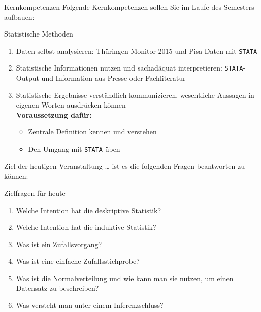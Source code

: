 \documentclass[usenames,dvipsnames,handout]{beamer}
\begin{document}
\begin{frame}{Kernkompetenzen}
Folgende Kernkompetenzen sollen Sie im Laufe des Semesters aufbauen:
\begin{block}{Statistische Methoden}
\begin{enumerate}
\item{Daten selbst analysieren: Thüringen-Monitor 2015 und Pisa-Daten mit \texttt{STATA}}
\item{Statistische Informationen nutzen und sachadäquat interpretieren: \texttt{STATA}-Output und Information aus Presse oder Fachliteratur }
\item{Statistische Ergebnisse verständlich kommunizieren, wesentliche Aussagen in eigenen Worten ausdrücken können}\\
\vspace{0.5cm}
\textbf{Voraussetzung dafür:}
\begin{itemize}
\item{Zentrale Definition kennen und verstehen}
\item{Den Umgang mit \texttt{STATA} üben}
\end{itemize}
\end{enumerate}
\end{block}
\end{frame}

\begin{frame}{Ziel der heutigen Veranstaltung \dots}
ist es die folgenden Fragen beantworten zu können:
\begin{block}{Zielfragen für heute}
\begin{enumerate}
\item{Welche Intention hat die deskriptive Statistik?}
\item{Welche Intention hat die induktive Statistik?}
\item{Was ist ein Zufallsvorgang?}
\item{Was ist eine einfache Zufallsstichprobe?}
\item{Was ist die Normalverteilung und wie kann man sie nutzen,
um einen Datensatz zu beschreiben?}
\item{Was versteht man unter einem Inferenzschluss?}
\end{enumerate}
\end{block}
\end{frame}
\end{document}
